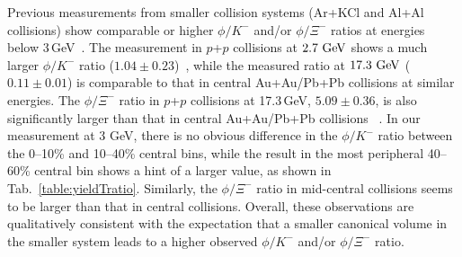 \documentclass[aps,tightenlines,superscriptaddress,twocolumn]{revtex4-1}
\begin{document}
Previous measurements from smaller collision systems (Ar+KCl and Al+Al collisions) show comparable or higher $\phi/K^-$ and/or $\phi/\Xi^-$ ratios at energies below 3\,GeV~\cite{FOPI_phi_AlAl,FOPI_phi_NiNi,HADES_phi_ArKCl,Xi_ArKCl_HADES}. The measurement in $p$+$p$ collisions at $\textup{2.7 GeV}$ shows a much larger $\phi/K^-$ ratio ($1.04\pm0.23$)~\cite{ANKE_phi}, while the measured ratio at $\textup{17.3 GeV}$ ($0.11\pm0.01$) is comparable to that in central Au+Au/Pb+Pb collisions at similar energies. The $\phi/\Xi^-$ ratio in $p$+$p$ collisions at 17.3\,GeV, $5.09\pm0.36$, is also significantly larger than that in central Au+Au/Pb+Pb collisions ~\cite{NA61SHINE_pp_piKp,NA61SHINE_pp_phi,NA61SHINE_pp_Xi}. In our measurement at 3 GeV, there is no obvious difference in the $\phi/K^-$ ratio between the \textup{0--10\%} and \textup{10--40\%} central bins, while the result in the most peripheral 40--60\% central bin shows a hint of a larger value, as shown in Tab.~\ref{table:yieldTratio}. Similarly, the $\phi/\Xi^-$ ratio in mid-central collisions seems to be larger than that in central collisions. Overall, these observations are qualitatively consistent with the expectation that a smaller canonical volume in the smaller system leads to a higher observed $\phi/K^-$ and/or $\phi/\Xi^-$ ratio.
\end{document}
